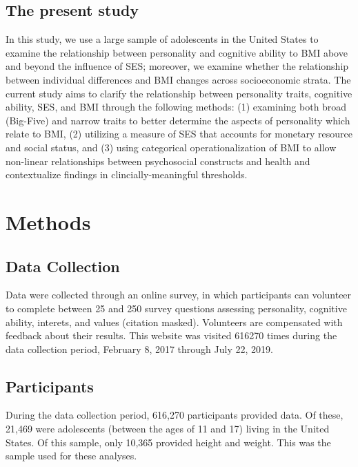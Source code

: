 \documentclass[man]{apa6}
\begin{document}
\hypertarget{the-present-study}{%
\subsection{The present study}\label{the-present-study}}

In this study, we use a large sample of adolescents in the United States to examine the relationship between personality and cognitive ability to BMI above and beyond the influence of SES; moreover, we examine whether the relationship between individual differences and BMI changes across socioeconomic strata. The current study aims to clarify the relationship between personality traits, cognitive ability, SES, and BMI through the following methods: (1) examining both broad (Big-Five) and narrow traits to better determine the aspects of personality which relate to BMI, (2) utilizing a measure of SES that accounts for monetary resource and social status, and (3) using categorical operationalization of BMI to allow non-linear relationships between psychosocial constructs and health and contextualize findings in clincially-meaningful thresholds.

\hypertarget{methods}{%
\section{Methods}\label{methods}}

\hypertarget{data-collection}{%
\subsection{Data Collection}\label{data-collection}}

Data were collected through an online survey, in which participants can volunteer to complete between 25 and 250 survey questions assessing personality, cognitive ability, interets, and values (citation masked). Volunteers are compensated with feedback about their results. This website was visited 616270 times during the data collection period, February 8, 2017 through July 22, 2019.

\hypertarget{participants}{%
\subsection{Participants}\label{participants}}

During the data collection period, 616,270 participants provided data. Of these, 21,469 were adolescents (between the ages of 11 and 17) living in the United States. Of this sample, only 10,365 provided height and weight. This was the sample used for these analyses.
\end{document}
